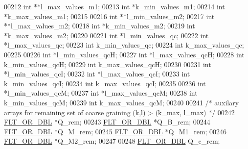 \begin{DoxyCode}
00212   \textcolor{keywordtype}{int}                   **l\_max\_values\_m1;
00213   \textcolor{keywordtype}{int}                   *k\_min\_values\_m1;
00214   \textcolor{keywordtype}{int}                   *k\_max\_values\_m1;
00215 
00216   \textcolor{keywordtype}{int}                   **l\_min\_values\_m2;
00217   \textcolor{keywordtype}{int}                   **l\_max\_values\_m2;
00218   \textcolor{keywordtype}{int}                   *k\_min\_values\_m2;
00219   \textcolor{keywordtype}{int}                   *k\_max\_values\_m2;
00220 
00221   \textcolor{keywordtype}{int}                   *l\_min\_values\_qc;
00222   \textcolor{keywordtype}{int}                   *l\_max\_values\_qc;
00223   \textcolor{keywordtype}{int}                   k\_min\_values\_qc;
00224   \textcolor{keywordtype}{int}                   k\_max\_values\_qc;
00225 
00226   \textcolor{keywordtype}{int}                   *l\_min\_values\_qcH;
00227   \textcolor{keywordtype}{int}                   *l\_max\_values\_qcH;
00228   \textcolor{keywordtype}{int}                   k\_min\_values\_qcH;
00229   \textcolor{keywordtype}{int}                   k\_max\_values\_qcH;
00230 
00231   \textcolor{keywordtype}{int}                   *l\_min\_values\_qcI;
00232   \textcolor{keywordtype}{int}                   *l\_max\_values\_qcI;
00233   \textcolor{keywordtype}{int}                   k\_min\_values\_qcI;
00234   \textcolor{keywordtype}{int}                   k\_max\_values\_qcI;
00235 
00236   \textcolor{keywordtype}{int}                   *l\_min\_values\_qcM;
00237   \textcolor{keywordtype}{int}                   *l\_max\_values\_qcM;
00238   \textcolor{keywordtype}{int}                   k\_min\_values\_qcM;
00239   \textcolor{keywordtype}{int}                   k\_max\_values\_qcM;
00240 
00241   \textcolor{comment}{/* auxilary arrays for remaining set of coarse graining (k,l) > (k\_max, l\_max) */}
00242   \hyperlink{group__data__structures_ga31125aeace516926bf7f251f759b6126}{FLT\_OR\_DBL}            *Q\_rem;
00243   \hyperlink{group__data__structures_ga31125aeace516926bf7f251f759b6126}{FLT\_OR\_DBL}            *Q\_B\_rem;
00244   \hyperlink{group__data__structures_ga31125aeace516926bf7f251f759b6126}{FLT\_OR\_DBL}            *Q\_M\_rem;
00245   \hyperlink{group__data__structures_ga31125aeace516926bf7f251f759b6126}{FLT\_OR\_DBL}            *Q\_M1\_rem;
00246   \hyperlink{group__data__structures_ga31125aeace516926bf7f251f759b6126}{FLT\_OR\_DBL}            *Q\_M2\_rem;
00247 
00248   \hyperlink{group__data__structures_ga31125aeace516926bf7f251f759b6126}{FLT\_OR\_DBL}            Q\_c\_rem;

\end{DoxyCode}
